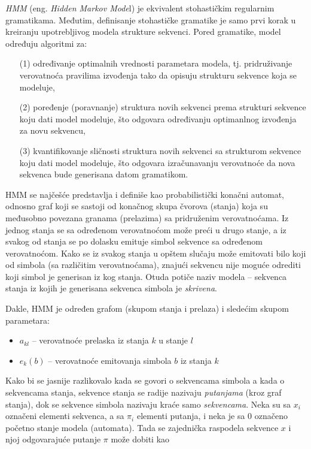 \documentclass[a4paper, 12pt]{article}
\begin{document}
\textit{HMM} (eng. \textit{Hidden Markov Mode}l) je ekvivalent stohastičkim regularnim gramatikama. Međutim, definisanje stohastičke gramatike je samo prvi korak u kreiranju upotrebljivog modela strukture sekvenci. Pored gramatike, model određuju algoritmi za:

\begin{enumerate}
\item[(1)] određivanje optimalnih vrednosti parametara modela, tj. pridruživanje verovatnoća pravilima izvođenja tako da opisuju strukturu sekvence koja se modeluje,
\item[(2)] poređenje (poravnanje) struktura novih sekvenci prema strukturi sekvence koju dati model modeluje, što odgovara određivanju optimanlnog izvođenja za novu sekvencu,
\item[(3)] kvantifikovanje sličnosti struktura novih sekvenci sa strukturom sekvence koju dati model modeluje, što odgovara izračunavanju verovatnoće da nova sekvenca bude generisana datom gramatikom.
\end{enumerate}

HMM se najčešće predstavlja i definiše kao probabilistički konačni automat, odnosno graf koji se sastoji od konačnog skupa čvorova (stanja) koja su međusobno povezana granama (prelazima) sa pridruženim verovatnoćama. Iz jednog stanja se sa određenom verovatnoćom može preći u drugo stanje, a iz svakog od stanja se po dolasku emituje simbol sekvence sa određenom verovatnoćom. Kako se iz svakog stanja u opštem slučaju može emitovati bilo koji od simbola (sa različitim verovatnoćama), znajući sekvencu nije moguće odrediti koji simbol je generisan iz kog stanja. Otuda potiče naziv modela -- sekvenca stanja iz kojih je generisana sekvenca simbola je \textit{skrivena}.

\noindent Dakle, HMM je određen grafom (skupom stanja i prelaza) i sledećim skupom parametara:

\begin{itemize}[itemsep=-0.03ex]
\renewcommand\labelitemi{\small$\bullet$}
\vspace*{-0.1cm}
\item $a_{kl}$ -- verovatnoće prelaska iz stanja $k$ u stanje $l$ 
\item $e_k(b)$ -- verovatnoće emitovanja simbola $b$ iz stanja $k$
\vspace*{-0.1cm}
\end{itemize}

\noindent Kako bi se jasnije razlikovalo kada se govori o sekvencama simbola a kada o sekvencama stanja, sekvence stanja se radije nazivaju \textit{putanjama} (kroz graf stanja), dok se sekvence simbola nazivaju kraće samo \textit{sekvencama}. Neka su sa $x_i$ označeni elementi sekvenca, a sa $\pi_i$ elementi putanja, i neka je sa $0$ označeno početno stanje modela (automata). Tada se zajednička raspodela sekvence $x$ i njoj odgovarajuće putanje $\pi$ može dobiti kao
\end{document}
